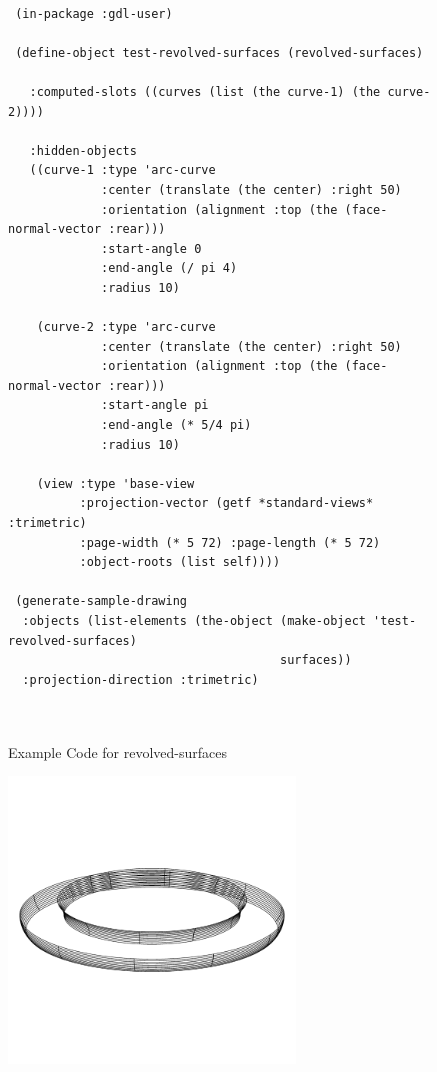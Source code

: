 \documentclass [11pt]{book}
\begin{document}
\begin{itemize}
\begin{figure}
\begin{lrbox}{\boxedverb}
\begin{minipage}{\linewidth}
{\begin{verbatim}

 (in-package :gdl-user)

 (define-object test-revolved-surfaces (revolved-surfaces)

   :computed-slots ((curves (list (the curve-1) (the curve-2))))
   
   :hidden-objects 
   ((curve-1 :type 'arc-curve
             :center (translate (the center) :right 50)
             :orientation (alignment :top (the (face-normal-vector :rear)))
             :start-angle 0
             :end-angle (/ pi 4)
             :radius 10)
    
    (curve-2 :type 'arc-curve
             :center (translate (the center) :right 50)
             :orientation (alignment :top (the (face-normal-vector :rear)))
             :start-angle pi
             :end-angle (* 5/4 pi)
             :radius 10)
    
    (view :type 'base-view
          :projection-vector (getf *standard-views* :trimetric)
          :page-width (* 5 72) :page-length (* 5 72)
          :object-roots (list self))))
 
 (generate-sample-drawing 
  :objects (list-elements (the-object (make-object 'test-revolved-surfaces)
                                      surfaces))
  :projection-direction :trimetric)
 
  
\end{verbatim}}
\end{minipage}
\end{lrbox}
\fbox{\usebox{\boxedverb}}

\caption{Example Code for revolved-surfaces}

\label{fig:example-code-revolved-surfaces}

\end{figure}

\begin{figure}
\begin{center}
\includegraphics[width=3in,height=3in]{../images/example-revolved-surfaces.pdf}
\end{center}


\end{figure}
\end{itemize}
\end{document}
